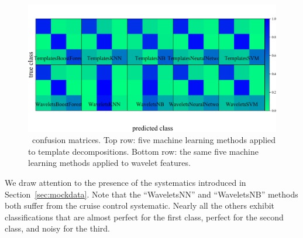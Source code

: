 \begin{figure}
	\begin{center}
    \includegraphics[width=\textwidth]{./fig/all_snphotcc_cm.png}
		\caption{\snphotcc\ confusion matrices.
    Top row: five machine learning methods applied to template decompositions.
    Bottom row: the same five machine learning methods applied to wavelet features.}
		\label{fig:snphotcc_cm}
	\end{center}
\end{figure}

We draw attention to the presence of the systematics introduced in Section~\ref{sec:mockdata}.
Note that the ``WaveletsNN'' and ``WaveletsNB'' methods both suffer from the cruise control systematic.
Nearly all the others exhibit classifications that are almost perfect for the first class, perfect for the second class, and noisy for the third.

%
